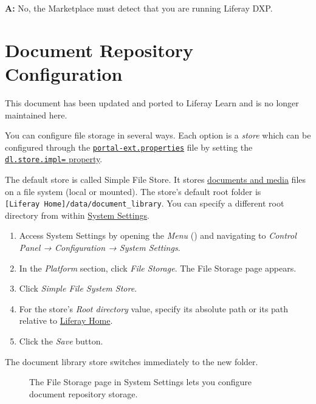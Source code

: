 \textbf{A:} No, the Marketplace must detect that you are running Liferay
DXP.

\chapter{Document Repository
Configuration}\label{document-repository-configuration}

{This document has been updated and ported to Liferay Learn and is no
longer maintained here.}

You can configure file storage in several ways. Each option is a
\emph{store} which can be configured through the
\href{/docs/7-2/deploy/-/knowledge_base/d/portal-properties}{\texttt{portal-ext.properties}}
file by setting the
\href{@platform-ref@/7.2-latest/propertiesdoc/portal.properties.html\#Document\%20Library\%20Service}{\texttt{dl.store.impl=}
property}.

The default store is called Simple File Store. It stores
\href{/docs/7-2/user/-/knowledge_base/u/managing-documents-and-media}{documents
and media} files on a file system (local or mounted). The store's
default root folder is
\texttt{{[}Liferay\ Home{]}/data/document\_library}. You can specify a
different root directory from within
\href{/docs/7-2/user/-/knowledge_base/u/system-settings}{System
Settings}.

\begin{enumerate}
\def\labelenumi{\arabic{enumi}.}
\item
  Access System Settings by opening the \emph{Menu}
  ()
  and navigating to \emph{Control Panel → Configuration → System
  Settings}.
\item
  In the \emph{Platform} section, click \emph{File Storage}. The File
  Storage page appears.
\item
  Click \emph{Simple File System Store}.
\item
  For the store's \emph{Root directory} value, specify its absolute path
  or its path relative to
  \href{/docs/7-2/deploy/-/knowledge_base/d/liferay-home}{Liferay Home}.
\item
  Click the \emph{Save} button.
\end{enumerate}

The document library store switches immediately to the new folder.

\begin{figure}
\centering
{}
\caption{The File Storage page in System Settings lets you configure
document repository storage.}
\end{figure}

